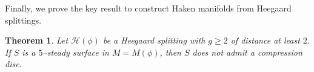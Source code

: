 \documentclass[11pt, oneside]{amsart}
\newtheorem{thm}[lemma]{Theorem}
\theoremstyle{definition}
\theoremstyle{definition}
\newcommand{\calH} {\ensuremath {\mathcal{H}}}
\begin{document}
Finally, we prove the key result to construct Haken manifolds from Heegaard splittings.

\begin{thm}\label{thm:steady_incompressible}
Let $\calH(\phi)$ be a Heegaard splitting with $g\geq 2$ of distance at least $2$. If $S$ is a $5$--steady surface in $M=M(\phi)$, then $S$ does not admit a compression disc.
\end{thm}
\end{document}
